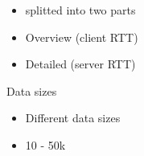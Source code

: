 \begin{itemize}
    \item splitted into two parts
    \item Overview (client RTT)
    \item Detailed (server RTT)
\end{itemize}

\begin{block}{Data sizes}
    \begin{itemize}
        \item Different data sizes
        \item 10 - 50k
    \end{itemize}
\end{block}